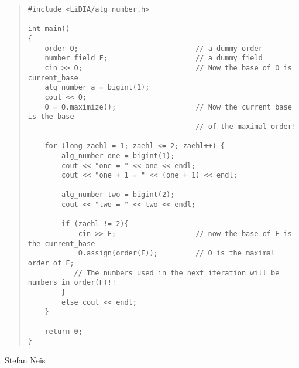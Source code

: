 \begin{quote}
\begin{verbatim}
#include <LiDIA/alg_number.h>

int main()
{
    order O;                            // a dummy order
    number_field F;                     // a dummy field
    cin >> O;                           // Now the base of O is current_base
    alg_number a = bigint(1);
    cout << O;
    O = O.maximize();                   // Now the current_base is the base
                                        // of the maximal order!
                                        
    for (long zaehl = 1; zaehl <= 2; zaehl++) {
        alg_number one = bigint(1);
        cout << "one = " << one << endl;
        cout << "one + 1 = " << (one + 1) << endl;

        alg_number two = bigint(2);
        cout << "two = " << two << endl;

        if (zaehl != 2){
            cin >> F;                   // now the base of F is the current_base
            O.assign(order(F));         // O is the maximal order of F;
           // The numbers used in the next iteration will be numbers in order(F)!!
        }
        else cout << endl;
    }

    return 0;
}
\end{verbatim}
\end{quote}



\AUTHOR

Stefan Neis
